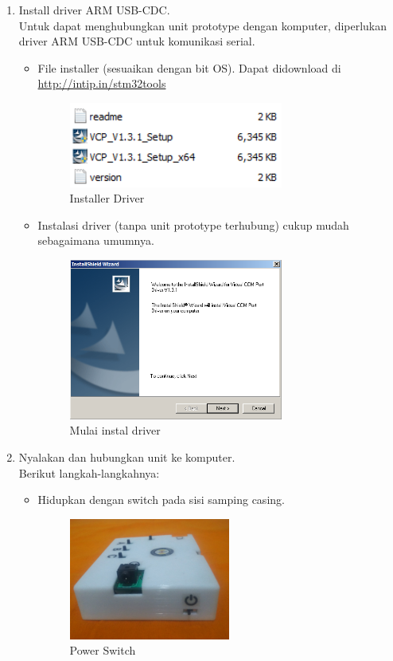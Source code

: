 \documentclass[12pt,]{article}
\begin{document}
	\begin{enumerate}
		\item Install driver ARM USB-CDC.\\
		Untuk dapat menghubungkan unit prototype dengan komputer,
		diperlukan driver ARM USB-CDC untuk komunikasi serial.
		
		\begin{itemize}
			\item File installer (sesuaikan dengan bit OS).
			Dapat didownload di \url{http://intip.in/stm32tools}
			\begin{figure}[!ht]
				\centering
				\includegraphics[width=200pt]{images/terminal/driver}
				\caption{Installer Driver}
			\end{figure}
		
			\item Instalasi driver (tanpa unit prototype terhubung) cukup mudah sebagaimana umumnya.
			\begin{figure}[!ht]
				\centering
				\includegraphics[width=200pt]{images/terminal/install_driver}
				\caption{Mulai instal driver}
			\end{figure}
		\end{itemize}
		
		\newpage
		\item Nyalakan dan hubungkan unit ke komputer.\\
		
		Berikut langkah-langkahnya:
		\begin{itemize}
			\item Hidupkan dengan switch pada sisi samping casing.
			\begin{figure}[!ht]
				\centering
				\includegraphics[width=150pt]{images/foto/pwrsw}
				\caption{Power Switch}
			\end{figure}
		

\end{itemize}
\end{enumerate}
\end{document}
